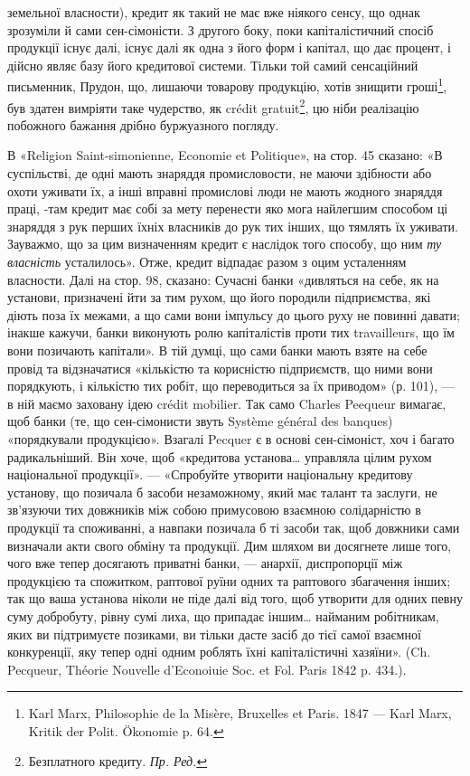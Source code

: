 \parcont{}  %
земельної власности), кредит як такий не має вже ніякого сенсу, що однак
зрозуміли й сами сен-сімоністи. З другого боку, поки капіталістичний спосіб
продукції існує далі, існує далі як одна з його форм і капітал, що дає процент,
і дійсно являє базу його кредитової системи. Тільки той самий сенсаційний письменник,
Прудон, що, лишаючи товарову продукцію, хотів знищити гроші\footnote{
Karl Marx, Philosophie de la Misère, Bruxelles et Paris. 1847 — Karl Marx, Kritik der Polit.
Ökonomie p. 64.
},
був здатен вимріяти таке чудерство, як crédit gratuit\footnote*{
Безплатного кредиту. \emph{Пр. Ред.}
}, цю ніби реалізацію побожного
бажання дрібно буржуазного погляду.

В «Religion Saint-simonienne, Economie et Politique», на стор. 45 сказано:
«В суспільстві, де одні мають знаряддя промисловости, не маючи здібности або
охоти уживати їх, а інші вправні промислові люди не мають жодного знаряддя
праці, -там кредит має собі за мету перенести яко мога найлегшим способом
ці знаряддя з рук перших їхніх власників до рук тих інших, що тямлять їх
уживати. Зауважмо, що за цим визначенням кредит є наслідок того способу, що
ним \emph{ту власність} усталилось». Отже, кредит відпадає разом з оцим усталенням
власности. Далі на стор. 98, сказано: Сучасні банки «дивляться на себе, як на
установи, призначені йти за тим рухом, що його породили підприємства, які діють
поза їх межами, а що сами вони імпульсу до цього руху не повинні давати; інакше
кажучи, банки виконують ролю капіталістів проти тих travailleurs, що їм вони позичають
капітали». В тій думці, що сами банки мають взяте на себе провід та відзначатися
«кількістю та корисністю підприємств, що ними вони порядкують, і кількістю
тих робіт, що переводиться за їх приводом» (р. 101), — в ній маємо заховану
ідею crédit mobilier. Так само Charles Peequeur вимагає, щоб банки (те, що сен-сімонисти
звуть Système général des banques) «порядкували продукцією». Взагалі Pecquer
є в основі сен-сімоніст, хоч і багато радикальніший. Він хоче, щоб «кредитова
установа\dots{} управляла цілим рухом національної продукції». — «Спробуйте
утворити національну кредитову установу, що позичала б засоби незаможному,
який має талант та заслуги, не зв’язуючи тих довжників між собою примусовою
взаємною солідарністю в продукції та споживанні, а навпаки позичала б
ті засоби так, щоб довжники сами визначали акти свого обміну та продукції.
Дим шляхом ви досягнете лише того, чого вже тепер досягають приватні банки, —
анархії, диспропорції між продукцією та спожитком, раптової руїни одних та
раптового збагачення інших; так що ваша установа ніколи не піде далі від того,
щоб утворити для одних певну суму добробуту, рівну сумі лиха, що припадає
іншим\dots{} найманим робітникам, яких ви підтримуєте позиками, ви тільки дасте
засіб до тієї самої взаємної конкуренції, яку тепер одні одним роблять їхні капіталістичні
хазяїни». (Ch. Pecqueur, Théorie Nouvelle d’Econoiuie Soc. et Fol. Paris
1842 p. 434.).

